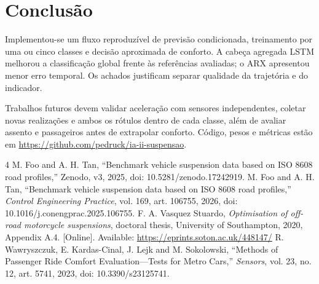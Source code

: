\documentclass[conference]{IEEEtran}
\begin{document}
\balance
\section{Conclusão}
Implementou-se um fluxo reproduzível de previsão condicionada, treinamento por uma ou cinco classes e decisão aproximada de conforto. A cabeça agregada LSTM melhorou a classificação global frente às referências avaliadas; o ARX apresentou menor erro temporal. Os achados justificam separar qualidade da trajetória e do indicador.

Trabalhos futuros devem validar aceleração com sensores independentes, coletar novas realizações e ambos os rótulos dentro de cada classe, além de avaliar assento e passageiros antes de extrapolar conforto. Código, pesos e métricas estão em \url{https://github.com/pedruck/ia-ii-suspensao}.

\begin{thebibliography}{4}
 M. Foo and A. H. Tan, ``Benchmark vehicle suspension data based on ISO 8608 road profiles,'' Zenodo, v3, 2025, doi: 10.5281/zenodo.17242919.
 M. Foo and A. H. Tan, ``Benchmark vehicle suspension data based on ISO 8608 road profiles,'' \emph{Control Engineering Practice}, vol. 169, art. 106755, 2026, doi: 10.1016/j.conengprac.2025.106755.
 F. A. Vasquez Stuardo, \emph{Optimisation of off-road motorcycle suspensions}, doctoral thesis, University of Southampton, 2020, Appendix A.4. [Online]. Available: \url{https://eprints.soton.ac.uk/448147/}
 R. Wawryszczuk, E. Kardas-Cinal, J. Lejk and M. Sokolowski, ``Methods of Passenger Ride Comfort Evaluation---Tests for Metro Cars,'' \emph{Sensors}, vol. 23, no. 12, art. 5741, 2023, doi: 10.3390/s23125741.
\end{thebibliography}
\end{document}
